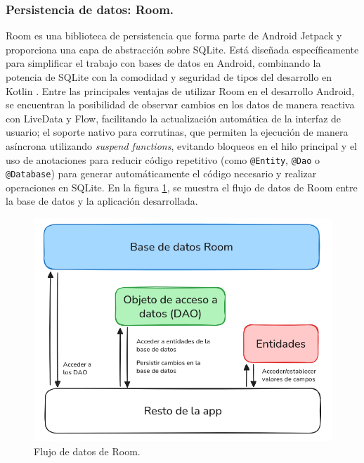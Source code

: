 \subsubsection{Persistencia de datos: Room.}

Room es una biblioteca de persistencia que forma parte de Android Jetpack \cite{Jetpack} y proporciona una capa de abstracción sobre SQLite. Está diseñada específicamente para simplificar el trabajo con bases de datos en Android, combinando la potencia de SQLite con la comodidad y seguridad de tipos del desarrollo en Kotlin \cite{Room}. Entre las principales ventajas de utilizar Room en el desarrollo Android, se encuentran la posibilidad de observar cambios en los datos de manera reactiva con LiveData y Flow, facilitando la actualización automática de la interfaz de usuario; el soporte nativo para corrutinas, que permiten la ejecución de manera asíncrona utilizando \textit{suspend functions}, evitando bloqueos en el hilo principal y el uso de anotaciones para reducir código repetitivo (como \texttt{@Entity}, \texttt{@Dao} o \texttt{@Database}) para generar automáticamente el código necesario y realizar operaciones en SQLite. En la figura \ref{fig:room}, se muestra el flujo de datos de Room entre la base de datos y la aplicación desarrollada.

\begin{figure}[ht]
\caption{Flujo de datos de Room. \cite{Room}}
\label{fig:room}
\includegraphics[width=\textwidth]{Figuras/room.png}
\centering
\end{figure}

